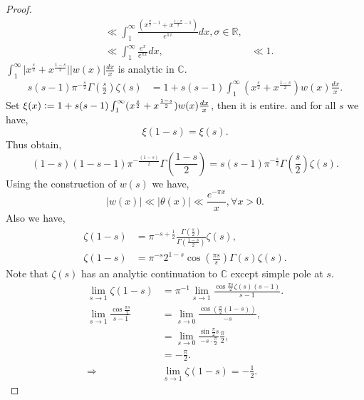 \documentclass{article}
\newcommand{\defeq}{\vcentcolon=}
\newcommand{\R}[0]{\mathbb{R}}
\newcommand{\C}[0]{\mathbb{C}}
\begin{document}
\begin{proof}
\begin{align*}
    &\ll  \int_1^\infty {\frac {(x^{{\frac \sigma 2}-1}+x^{{\frac {1-\sigma} 2}-1})} {e^{\pi x}}}dx,\sigma\in\R,\\
    &\ll  \int_1^\infty {\frac {e^x} {e^{\pi x}}}dx,
    & \ll  1.
  \end{align*}
  $\int_1^\infty \vert x^{{\frac s 2}}+x^{{\frac {1-s} 2}}\vert \vert w(x)\vert {\frac {dx} x}$ is analytic in $\C$. 
  \begin{align*}
    s(s-1)\pi^{-{\frac s 2}}\Gamma\left({\frac s 2}\right)\zeta(s) & = 1+s(s-1)\int^\infty_1(x^{{\frac s 2}} +x^{{\frac {1-s} 2}})w(x){\frac {dx} x}.
  \end{align*}
  Set $\xi(x) \defeq 1+s(s-1)\int^\infty_1(x^{{\frac s 2}} +x^{{\frac {1-s} 2}})w(x){\frac {dx} x}$, then it is entire. and for all $s$ we have,
  \begin{equation*}
    \xi(1-s)=\xi(s).
  \end{equation*}
  Thus obtain,
  \begin{equation*}
    (1-s)(1-s-1)\pi^{-{\frac {(1-s)} 2}}\Gamma\left({\frac {1-s} 2}\right) = s(s-1)\pi^{-{\frac s 2}}\Gamma\left({\frac s 2}\right)\zeta(s).
  \end{equation*}
  Using the construction of $w(s)$ we have,
  \begin{equation*}
    \vert w(x)\vert \ll \vert \theta(x)\vert \ll  {\frac {e^{-\pi x}} x},\forall x>0.
  \end{equation*}
  Also we have,
  \begin{align*}
    \zeta(1-s)&= \pi^{-s+{\frac 1 2}}{\frac {\Gamma\left({\frac s 2}\right)} {\Gamma\left({\frac {1-s} 2}\right)}}\zeta(s),\\
    \zeta(1-s) & = \pi^{-s}2^{1-s}\cos\left({\frac {\pi s} s}\right)\Gamma(s)\zeta(s).
  \end{align*}
  Note that $\zeta(s)$ has an analytic continuation to $\C$ except simple pole at $s$.
  \begin{align*}
    \lim_{s\to 1}\zeta(1-s) &= \pi^{-1}\lim_{s\to 1}{\frac {\cos{\frac {\pi s} 2} \zeta(s)(s-1)} {s-1}}.\\
    \lim_{s\to 1}{\frac {\cos{\frac {\pi s} 2}} {s-1}} & = \lim_{s\to 0}{\frac {\cos\left({\frac \pi 2}(1-s)\right)} {-s}},\\
    & = \lim_{s\to0}{\frac {\sin{\frac \pi 2}s} {-s\cdot{\frac \pi 2}}}{\frac \pi 2},\\
    & = -{\frac \pi 2}.\\
    \Rightarrow& \lim_{s\to 1}\zeta(1-s) = -{\frac 1 2}.
  \end{align*}

\end{proof}
\end{document}
